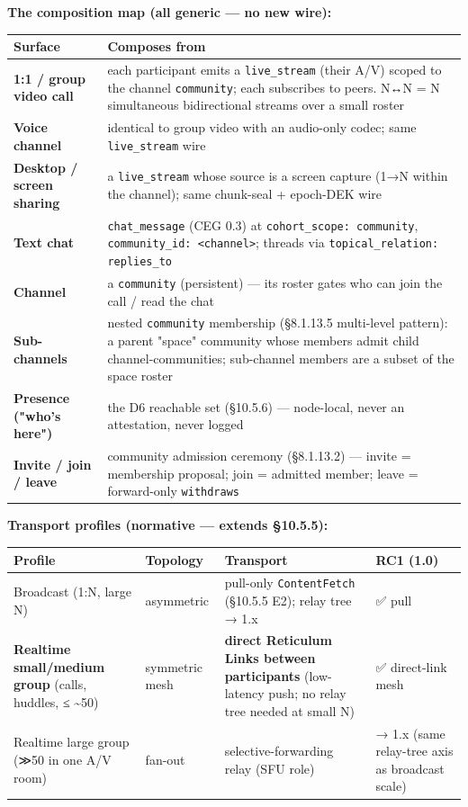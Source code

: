 \documentclass[11pt]{article}
\begin{document}
\textbf{The composition map (all generic — no new wire):}


{\footnotesize
\begin{longtable}{|p{8.0cm}|p{8.0cm}|}\hline
\textbf{Surface} & \textbf{Composes from} \\ \hline\endhead
\textbf{1:1 / group video call} & each participant emits a \texttt{live\_stream} (their A/V) scoped to the channel \texttt{community}; each subscribes to peers. N↔N = N simultaneous bidirectional streams over a small roster \\ \hline
\textbf{Voice channel} & identical to group video with an audio-only codec; same \texttt{live\_stream} wire \\ \hline
\textbf{Desktop / screen sharing} & a \texttt{live\_stream} whose source is a screen capture (1→N within the channel); same chunk-seal + epoch-DEK wire \\ \hline
\textbf{Text chat} & \texttt{chat\_message} (CEG 0.3) at \texttt{cohort\_scope: community}, \texttt{community\_id: <channel>}; threads via \texttt{topical\_relation: replies\_to} \\ \hline
\textbf{Channel} & a \texttt{community} (persistent) — its roster gates who can join the call / read the chat \\ \hline
\textbf{Sub-channels} & nested \texttt{community} membership (§8.1.13.5 multi-level pattern): a parent "space" community whose members admit child channel-communities; sub-channel members are a subset of the space roster \\ \hline
\textbf{Presence ("who's here")} & the D6 reachable set (§10.5.6) — node-local, never an attestation, never logged \\ \hline
\textbf{Invite / join / leave} & community admission ceremony (§8.1.13.2) — invite = membership proposal; join = admitted member; leave = forward-only \texttt{withdraws} \\ \hline
\end{longtable}}


\textbf{Transport profiles (normative — extends §10.5.5):}


{\scriptsize
\begin{longtable}{|p{4.0cm}|p{4.0cm}|p{4.0cm}|p{4.0cm}|}\hline
\textbf{Profile} & \textbf{Topology} & \textbf{Transport} & \textbf{RC1 (1.0)} \\ \hline\endhead
Broadcast (1:N, large N) & asymmetric & pull-only \texttt{ContentFetch} (§10.5.5 E2); relay tree → 1.x & ✅ pull \\ \hline
\textbf{Realtime small/medium group} (calls, huddles, ≤ \textasciitilde{}50) & symmetric mesh & \textbf{direct Reticulum Links between participants} (low-latency push; no relay tree needed at small N) & ✅ direct-link mesh \\ \hline
Realtime large group (≫50 in one A/V room) & fan-out & selective-forwarding relay (SFU role) & → 1.x (same relay-tree axis as broadcast scale) \\ \hline
\end{longtable}}
\end{document}

